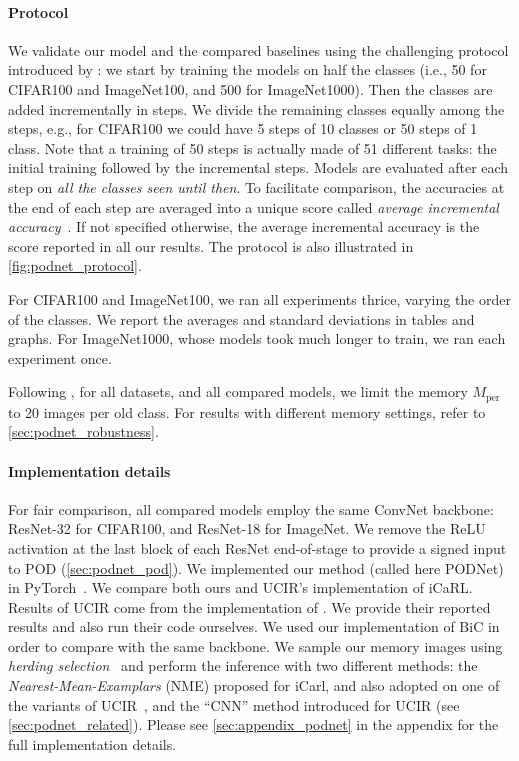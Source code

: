 \paragraph{Protocol} We validate our model and the compared baselines using the challenging protocol
introduced by \cite{hou2019ucir}: we start by training the models on half the classes (i.e., 50 for
CIFAR100 and ImageNet100, and 500 for ImageNet1000). Then the classes are added incrementally in
steps. We divide the remaining classes equally among the steps, e.g., for CIFAR100 we could have 5
steps of 10 classes or 50 steps of 1 class. Note that a training of 50 steps is actually made of 51
different tasks: the initial training followed by the incremental steps. Models are evaluated after
each step on \textit{all the classes seen until then}. To facilitate comparison, the accuracies at
the end of each step are averaged into a unique score called \textit{average incremental
    accuracy}~\citep{rebuffi2017icarl}. If not specified otherwise, the average incremental accuracy is
the score reported in all our results. The protocol is also illustrated in \autoref{fig:podnet_protocol}.

For CIFAR100 and ImageNet100, we ran all experiments thrice, varying the order of the classes. We
report the averages and standard deviations in tables and graphs. For ImageNet1000, whose models
took much longer to train, we ran each experiment once.

Following \cite{hou2019ucir}, for all datasets, and all compared models, we limit the memory
$M_\textrm{per}$ to 20 images per old class. For results with different memory settings, refer to
\autoref{sec:podnet_robustness}.

\paragraph{Implementation details} For fair comparison, all compared models employ the same
\ac{ConvNet} backbone: ResNet-32 for CIFAR100, and ResNet-18 for ImageNet. We remove the ReLU
activation at the last block of each ResNet end-of-stage to provide a signed input to POD
(\autoref{sec:podnet_pod}). We implemented our method (called here \ac{PODNet}) in
PyTorch~\citep{paszke2017pytorch}.
%
We compare both ours and UCIR's implementation of iCaRL. Results of UCIR come from the
implementation of \cite{hou2019ucir}. We provide their reported results and also run their code
ourselves. We used our implementation of BiC \citep{wu2019bias_correction} in order to compare with
the same backbone.
%
We sample our memory images using \textit{herding selection}~\citep{rebuffi2017icarl} and perform
the inference with two different methods: the \textit{Nearest-Mean-Examplars} (\ac{NME}) proposed
for iCarl, and also adopted on one of the variants of UCIR~\citep{hou2019ucir}, and the ``CNN''
method introduced for UCIR (see \autoref{sec:podnet_related}).
%
Please see \autoref{sec:appendix_podnet} in the appendix for the full implementation details.

